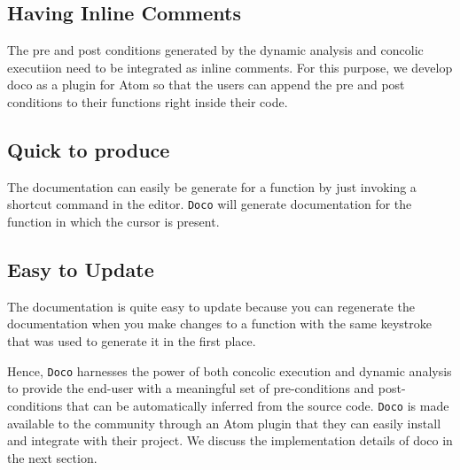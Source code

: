     \subsection{Having Inline Comments} The pre and post conditions generated by the dynamic analysis and concolic executiion need to be integrated as inline comments. For this purpose, we develop doco as a plugin for Atom \cite{Atom} so that the users can append the pre and post conditions to their functions right inside their code.
    
    \subsection{Quick to produce} The documentation can easily be generate for a function by just invoking a shortcut command in the editor. \texttt{Doco} will generate documentation for the function in which the cursor is present. 
    
    \subsection{Easy to Update} The documentation is quite easy to update because you can regenerate the documentation when you make changes to a function with the same keystroke that was used to generate it in the first place.
    
 Hence, \texttt{Doco} harnesses the power of both concolic execution and dynamic analysis to provide the end-user with a meaningful set of pre-conditions and post-conditions that can be automatically inferred from the source code. \texttt{Doco} is made available to the community through an Atom plugin that they can easily install and integrate with their project. We discuss the implementation details of doco in the next section.











